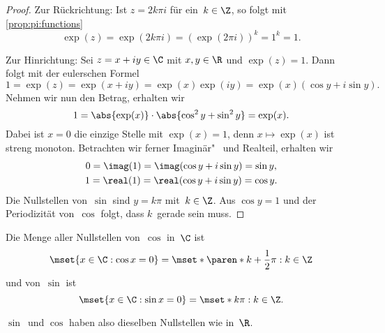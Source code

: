 \documentclass[a4paper]{article}
\begin{document}
\begin{proof}
    Zur Rückrichtung: Ist $z = 2k\pi i$ für ein~$k \in \Z$, so folgt mit \cref{prop:pi:functions}
    \begin{equation*}
        \exp(z) = \exp(2k\pi i) = (\exp(2\pi i))^k = 1^k = 1.
    \end{equation*}

    Zur Hinrichtung: Sei $z = x+iy \in \C$ mit $x,y \in \R$ und $\exp(z) = 1$. Dann folgt mit der eulerschen Formel
    \begin{equation*}
        1 = \exp(z) = \exp(x+iy) = \exp(x)\exp(iy) = \exp(x) (\cos y + i\sin y).
    \end{equation*}
    Nehmen wir nun den Betrag, erhalten wir
    \begin{equation*}
        1 = \abs{\exp(x)} \cdot \abs{\cos^2y + \sin^2y} = \exp(x).
    \end{equation*}
    Dabei ist $x = 0$ die einzige Stelle mit $\exp(x) = 1$, denn $x \mapsto \exp(x)$ ist streng monoton. Betrachten wir ferner Imaginär"~ und Realteil, erhalten wir
    \begin{gather*}
        0 = \imag(1) = \imag(\cos y + i\sin y) = \sin y, \\
        1 = \real(1) = \real(\cos y + i\sin y) = \cos y.
    \end{gather*}
    Die Nullstellen von~$\sin$ sind $y = k\pi$ mit~$k \in \Z$. Aus $\cos y = 1$ und der Periodizität von~$\cos$ folgt, dass $k$~gerade sein muss.
\end{proof}

\begin{corollary}[Nullstellen in~$\C$]
    Die Menge aller Nullstellen von~$\cos$ in~$\C$ ist
    \begin{equation*}
        \mset{x \in \C : \cos x = 0} = \mset*{\paren*{k+\frac{1}{2}}\pi : k \in \Z}
    \end{equation*}
    und von~$\sin$ ist
    \begin{equation*}
        \mset{x \in \C : \sin x = 0} = \mset*{k\pi : k \in \Z}.
    \end{equation*}
\end{corollary}

$\sin$~und $\cos$ haben also dieselben Nullstellen wie in~$\R$.
\end{document}
